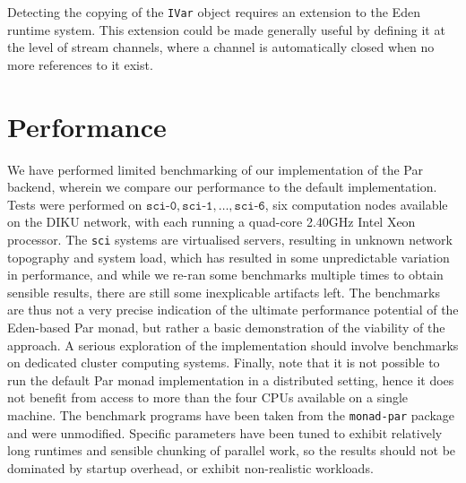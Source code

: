 \documentclass[a4paper, oneside, final]{article}
\begin{document}
Detecting the copying of the \texttt{IVar} object requires an
extension to the Eden runtime system.  This extension could be made
generally useful by defining it at the level of stream channels, where
a channel is automatically closed when no more references to it exist.

\section{Performance}

We have performed limited benchmarking of our implementation of the
Par backend, wherein we compare our performance to the default
implementation.  Tests were performed on
$\texttt{sci-0},\texttt{sci-1},\ldots,\texttt{sci-6}$, six computation
nodes available on the DIKU network, with each running a quad-core
2.40GHz Intel Xeon processor.  The \texttt{sci} systems are
virtualised servers, resulting in unknown network topography and
system load, which has resulted in some unpredictable variation in
performance, and while we re-ran some benchmarks multiple times to
obtain sensible results, there are still some inexplicable artifacts
left.  The benchmarks are thus not a very precise indication of the
ultimate performance potential of the Eden-based Par monad, but rather
a basic demonstration of the viability of the approach.  A serious
exploration of the implementation should involve benchmarks on
dedicated cluster computing systems.  Finally, note that it is not
possible to run the default Par monad implementation in a distributed
setting, hence it does not benefit from access to more than the four
CPUs available on a single machine.  The benchmark programs have been
taken from the \texttt{monad-par} package and were unmodified.
Specific parameters have been tuned to exhibit relatively long
runtimes and sensible chunking of parallel work, so the results should
not be dominated by startup overhead, or exhibit non-realistic
workloads.
\end{document}
